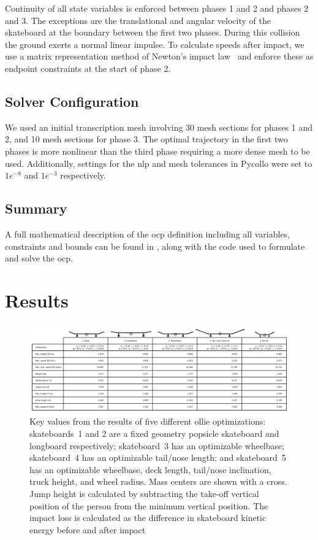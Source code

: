 \documentclass[default,iicol]{sn-jnl}
\begin{document}
Continuity of all state variables is enforced between phases 1 and 2 and phases 2 and 3. The exceptions are the translational and angular velocity of the skateboard at the boundary between the first two phases. During this collision the ground exerts a normal linear impulse. To calculate speeds after impact, we use a matrix representation method of Newton's impact law~\cite{vallery_heike_advanced_2018} and enforce these as endpoint constraints at the start of phase 2.

\subsection{Solver Configuration}\label{s_settings}
We used an initial transcription mesh involving 30 mesh sections for phases 1 and 2, and 10 mesh sections for phase 3. The optimal trajectory in the first two phases is more nonlinear than the third phase requiring a more dense mesh to be used.
Additionally, settings for the \gls{nlp} and mesh tolerances in Pycollo were set to $1e^{-8}$ and $1e^{-3}$ respectively.

\subsection{Summary}\label{s_summary}
A full mathematical description of the \gls{ocp} definition including all variables, constraints and bounds can be found in \cite{heinen_optimal_2022}, along with the code used to formulate and solve the \gls{ocp}.


\section{Results}

\begin{figure}
    \centering
    \includegraphics[width=\textwidth]{paper/figure/Results/ResultsTable.png}
    \caption[Results benchmarks]{Key values from the results of five different ollie optimizations: skateboards~1 and 2 are a fixed geometry popsicle skateboard and longboard respectively; skateboard~3 has an optimizable wheelbase; skateboard~4 has an optimizable tail/nose length; and skateboard~5 has an optimizable wheelbase, deck length, tail/nose inclination, truck height, and wheel radius. Mass centers are shown with a cross. Jump height is calculated by subtracting the take-off vertical position of the person from the minimum vertical position. The impact loss is calculated as the difference in skateboard kinetic energy before and after impact}
    \label{fig:resultstable}
\end{figure}
\end{document}
